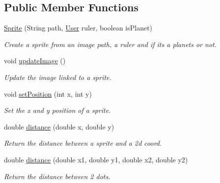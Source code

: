 \subsection*{Public Member Functions}
\begin{DoxyCompactItemize}
\item 
\mbox{\hyperlink{classfr_1_1groupe40_1_1projet_1_1model_1_1_sprite_acbe678213b404fd8ae1a77fe274fdca8}{Sprite}} (String path, \mbox{\hyperlink{classfr_1_1groupe40_1_1projet_1_1client_1_1_user}{User}} ruler, boolean is\+Planet)
\begin{DoxyCompactList}\small\item\em Create a sprite from an image path, a ruler and if its a planets or not. \end{DoxyCompactList}\item 
\mbox{\label{classfr_1_1groupe40_1_1projet_1_1model_1_1_sprite_a762bbcf4f03eecab8de2b05aa19a103a}} 
void \mbox{\hyperlink{classfr_1_1groupe40_1_1projet_1_1model_1_1_sprite_a762bbcf4f03eecab8de2b05aa19a103a}{update\+Image}} ()
\begin{DoxyCompactList}\small\item\em Update the image linked to a sprite. \end{DoxyCompactList}\item 
void \mbox{\hyperlink{classfr_1_1groupe40_1_1projet_1_1model_1_1_sprite_ab3b2649df13b98ba229c292328e31b25}{set\+Position}} (int x, int y)
\begin{DoxyCompactList}\small\item\em Set the x and y position of a sprite. \end{DoxyCompactList}\item 
double \mbox{\hyperlink{classfr_1_1groupe40_1_1projet_1_1model_1_1_sprite_a4907c1229ac5b6a614e880649240ea7b}{distance}} (double x, double y)
\begin{DoxyCompactList}\small\item\em Return the distance between a sprite and a 2d coord. \end{DoxyCompactList}\item 
double \mbox{\hyperlink{classfr_1_1groupe40_1_1projet_1_1model_1_1_sprite_aa74fb93449c20a79f16edca9a7ae9482}{distance}} (double x1, double y1, double x2, double y2)
\begin{DoxyCompactList}\small\item\em Return the distance between 2 dots. \end{DoxyCompactList}\item 

\end{DoxyCompactItemize}

